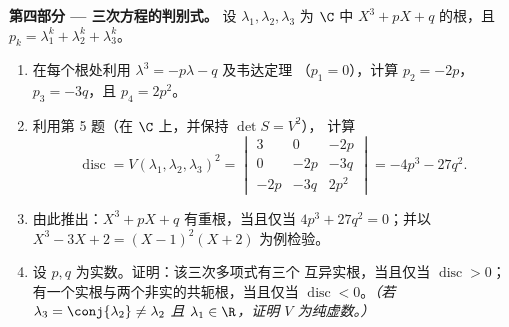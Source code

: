 \begin{problem}
\medskip
\noindent\textbf{第四部分 --- 三次方程的判别式。}
设 $\lambda_1, \lambda_2, \lambda_3$ 为 $\C$ 中 $X^3
+ pX + q$ 的根，且 $p_k = \lambda_1^k + \lambda_2^k + \lambda_3^k$。
\begin{enumerate}[resume]
  \item 在每个根处利用 $\lambda^3 = -p\lambda - q$ 及韦达定理
        （$p_1 = 0$），计算 $p_2 = -2p$，$p_3 = -3q$，且
        $p_4 = 2p^2$。
  \item 利用第 5 题（在 $\C$ 上，并保持 $\det S = V^2$），
        计算
        \[
        \operatorname{disc} = V(\lambda_1, \lambda_2,
        \lambda_3)^2 = \begin{vmatrix}
        3 & 0 & -2p\\
        0 & -2p & -3q\\
        -2p & -3q & 2p^2
        \end{vmatrix}
        = -4p^3 - 27q^2 .
        \]
  \item 由此推出：$X^3 + pX + q$ 有重根，当且仅当
        $4p^3 + 27q^2 = 0$；并以 $X^3 - 3X + 2 = (X -
        1)^2(X + 2)$ 为例检验。
  \item 设 $p, q$ 为实数。证明：该三次多项式有三个
        互异实根，当且仅当 $\operatorname{disc}
        > 0$；有一个实根与两个非实的共轭根，当且仅当
        $\operatorname{disc} < 0$。\emph{（若
        $\lambda_3 = \conj{\lambda_2} \neq \lambda_2$ 且
        $\lambda_1 \in \R$，证明 $V$ 为纯虚数。）}
\end{enumerate}


\end{problem}
